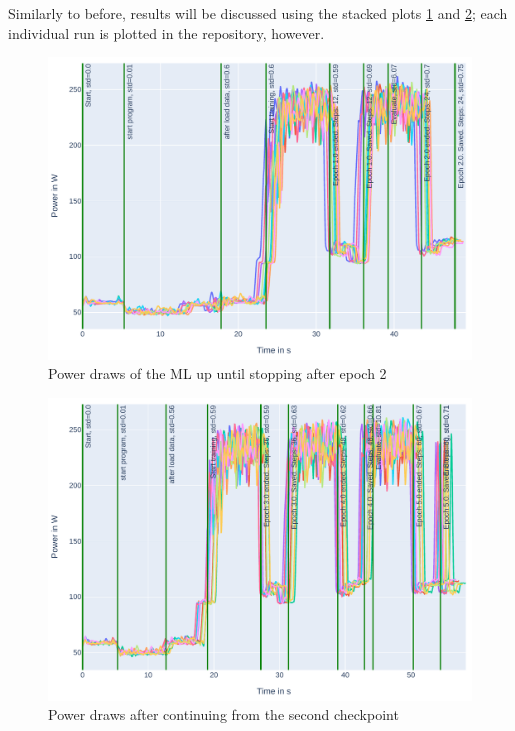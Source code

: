 Similarly to before, results will be discussed using the stacked plots \ref{fig:plot_partial_saved_stacked} and \ref{fig:plot_partial_saved_continue_stacked}; each individual run is plotted in the repository, however.

\begin{figure}
    \includegraphics[width=\linewidth]{power-measurements/stacked_plots/roberta_stop_after_saving.pdf}
    \caption{Power draws of the ML up until stopping after epoch 2}
    \label{fig:plot_partial_saved_stacked}
\end{figure}

\begin{figure}
    \includegraphics[width=\linewidth]{power-measurements/stacked_plots/roberta_continue_after_saving.pdf}
    \caption{Power draws after continuing from the second checkpoint}
    \label{fig:plot_partial_saved_continue_stacked}
\end{figure}

